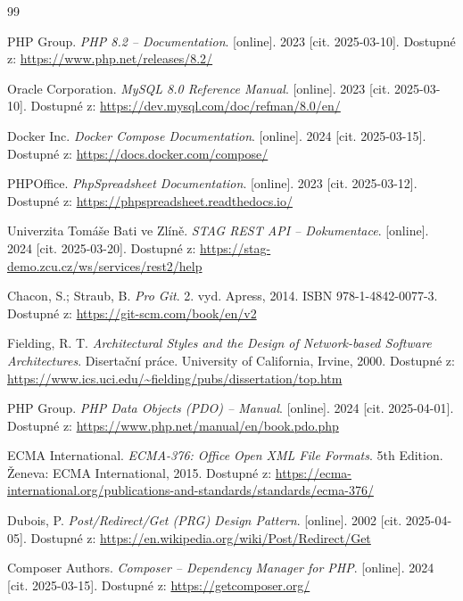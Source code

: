 \documentclass[12pt,a4paper]{report}
\begin{document}
\begin{thebibliography}{99}

PHP Group.
\textit{PHP 8.2 -- Documentation}.
[online]. 2023 [cit. 2025-03-10].
Dostupné z: \url{https://www.php.net/releases/8.2/}

Oracle Corporation.
\textit{MySQL 8.0 Reference Manual}.
[online]. 2023 [cit. 2025-03-10].
Dostupné z: \url{https://dev.mysql.com/doc/refman/8.0/en/}

Docker Inc.
\textit{Docker Compose Documentation}.
[online]. 2024 [cit. 2025-03-15].
Dostupné z: \url{https://docs.docker.com/compose/}

PHPOffice.
\textit{PhpSpreadsheet Documentation}.
[online]. 2023 [cit. 2025-03-12].
Dostupné z: \url{https://phpspreadsheet.readthedocs.io/}

Univerzita Tomáše Bati ve Zlíně.
\textit{STAG REST API -- Dokumentace}.
[online]. 2024 [cit. 2025-03-20].
Dostupné z: \url{https://stag-demo.zcu.cz/ws/services/rest2/help}

Chacon, S.; Straub, B.
\textit{Pro Git}.
2. vyd. Apress, 2014. ISBN 978-1-4842-0077-3.
Dostupné z: \url{https://git-scm.com/book/en/v2}

Fielding, R. T.
\textit{Architectural Styles and the Design of Network-based Software Architectures}.
Disertační práce. University of California, Irvine, 2000.
Dostupné z: \url{https://www.ics.uci.edu/~fielding/pubs/dissertation/top.htm}

PHP Group.
\textit{PHP Data Objects (PDO) -- Manual}.
[online]. 2024 [cit. 2025-04-01].
Dostupné z: \url{https://www.php.net/manual/en/book.pdo.php}

ECMA International.
\textit{ECMA-376: Office Open XML File Formats}.
5th Edition. Ženeva: ECMA International, 2015.
Dostupné z: \url{https://ecma-international.org/publications-and-standards/standards/ecma-376/}

Dubois, P.
\textit{Post/Redirect/Get (PRG) Design Pattern}.
[online]. 2002 [cit. 2025-04-05].
Dostupné z: \url{https://en.wikipedia.org/wiki/Post/Redirect/Get}

Composer Authors.
\textit{Composer -- Dependency Manager for PHP}.
[online]. 2024 [cit. 2025-03-15].
Dostupné z: \url{https://getcomposer.org/}


\end{thebibliography}
\end{document}
